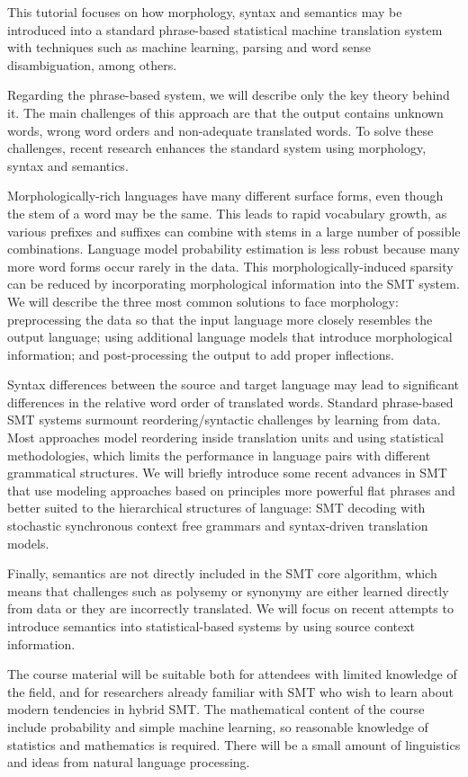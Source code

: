 \noindent
This tutorial focuses on how morphology, syntax and semantics may be introduced into a standard phrase-based statistical machine translation system with techniques such as machine learning, parsing and word sense disambiguation, among others.

Regarding the phrase-based system, we will describe only the key theory behind it. The main challenges of this approach are that the output contains unknown words, wrong word orders and non-adequate translated words. To solve these challenges, recent research enhances the standard system using morphology, syntax and semantics.

Morphologically-rich languages have many different surface forms, even though the stem of a word may be the same. This leads to rapid vocabulary growth, as various prefixes and suffixes can combine with stems in a large number of possible combinations. Language model probability estimation is less robust because many more word forms occur rarely in the data. This morphologically-induced sparsity can be reduced by incorporating morphological information into the SMT system. We will describe the three most common solutions to face morphology: preprocessing the data so that the input language more closely resembles the output language; using additional language models that introduce morphological information; and post-processing the output to add proper inflections.

Syntax differences between the source and target language may lead to significant differences in the relative word order of translated words. Standard phrase-based SMT systems surmount reordering/syntactic challenges by learning from data. Most approaches model reordering inside translation units and using statistical methodologies, which limits the performance in language pairs with different grammatical structures. We will briefly introduce some recent advances in SMT that use modeling approaches based on principles more powerful flat phrases and better suited to the hierarchical structures of language: SMT decoding with stochastic synchronous context free grammars and syntax-driven translation models.

Finally, semantics are not directly included in the SMT core algorithm, which means that challenges such as polysemy or synonymy are either learned directly from data or they are incorrectly translated. We will focus on recent attempts to introduce semantics into statistical-based systems by using source context information.

The course material will be suitable both for attendees with limited knowledge of the field, and for researchers already familiar with SMT who wish to learn about modern tendencies in hybrid SMT. The mathematical content of the course include probability and simple machine learning, so reasonable knowledge of statistics and mathematics is required. There will be a small amount of linguistics and ideas from natural language processing.


